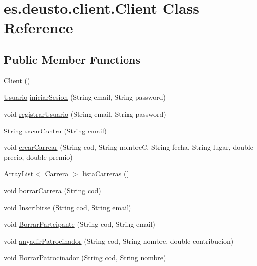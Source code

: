 \hypertarget{classes_1_1deusto_1_1client_1_1_client}{}\section{es.\+deusto.\+client.\+Client Class Reference}
\label{classes_1_1deusto_1_1client_1_1_client}
\subsection*{Public Member Functions}
\begin{DoxyCompactItemize}
\item 
\mbox{\hyperlink{classes_1_1deusto_1_1client_1_1_client_a71c03e318a72447da873297f3364f67f}{Client}} ()
\item 
\mbox{\hyperlink{classes_1_1deusto_1_1server_1_1jdo_1_1_usuario}{Usuario}} \mbox{\hyperlink{classes_1_1deusto_1_1client_1_1_client_a4cc1480125fa35b37c37e8e1e79d91f6}{iniciar\+Sesion}} (String email, String password)
\item 
void \mbox{\hyperlink{classes_1_1deusto_1_1client_1_1_client_a6f2674bcf110140f6a0c146f95c7e182}{registrar\+Usuario}} (String email, String password)
\item 
String \mbox{\hyperlink{classes_1_1deusto_1_1client_1_1_client_a6ce290f27e4f39f9493799cbc6112cc5}{sacar\+Contra}} (String email)
\item 
void \mbox{\hyperlink{classes_1_1deusto_1_1client_1_1_client_a0efc9ad350a61ae5277827eb1964b890}{crear\+Carrear}} (String cod, String nombreC, String fecha, String lugar, double precio, double premio)
\item 
Array\+List$<$ \mbox{\hyperlink{classes_1_1deusto_1_1server_1_1jdo_1_1_carrera}{Carrera}} $>$ \mbox{\hyperlink{classes_1_1deusto_1_1client_1_1_client_abf1f982fbf3beeaba8bdcf66a50cb489}{lista\+Carreras}} ()
\item 
void \mbox{\hyperlink{classes_1_1deusto_1_1client_1_1_client_aff43677afc5d700af05c4cd6df9abd67}{borrar\+Carrera}} (String cod)
\item 
void \mbox{\hyperlink{classes_1_1deusto_1_1client_1_1_client_adbe22bb52fdcd07747e848fb6f73d73d}{Inscribirse}} (String cod, String email)
\item 
void \mbox{\hyperlink{classes_1_1deusto_1_1client_1_1_client_aea291d51922d4526e50fc57eed4a00cb}{Borrar\+Partcipante}} (String cod, String email)
\item 
void \mbox{\hyperlink{classes_1_1deusto_1_1client_1_1_client_a7023d196eb023c279e693048e53e2116}{anyadir\+Patrocinador}} (String cod, String nombre, double contribucion)
\item 
void \mbox{\hyperlink{classes_1_1deusto_1_1client_1_1_client_a1e9f51f52427f81aebb6ee53839fbbde}{Borrar\+Patrocinador}} (String cod, String nombre)
\end{DoxyCompactItemize}
